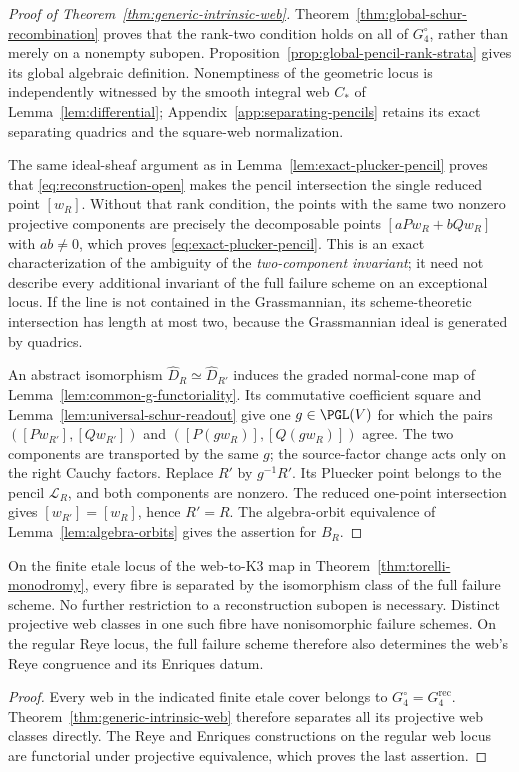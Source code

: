 \begin{proof}[Proof of Theorem~\ref{thm:generic-intrinsic-web}]
Theorem~\ref{thm:global-schur-recombination} proves that the
rank-two condition holds on all of \(G_4^\circ\), rather than
merely on a nonempty subopen.  Proposition~\ref{prop:global-pencil-rank-strata}
gives its global algebraic definition.  Nonemptiness of the geometric
locus is independently witnessed by the smooth integral web
\(C_*\) of Lemma~\ref{lem:differential}; Appendix~\ref{app:separating-pencils}
retains its exact separating quadrics and the square-web normalization.

The same ideal-sheaf argument as in
Lemma~\ref{lem:exact-plucker-pencil} proves that
\eqref{eq:reconstruction-open} makes the pencil intersection the
single reduced point \([w_R]\).  Without that rank condition,
the points with the same two nonzero projective components are
precisely the decomposable points \([aPw_R+bQw_R]\) with
\(ab\ne0\), which proves \eqref{eq:exact-plucker-pencil}.
This is an exact characterization of the ambiguity of the
\emph{two-component invariant}; it need not describe every
additional invariant of the full failure scheme on an exceptional
locus.  If the line is not contained in the Grassmannian, its
scheme-theoretic intersection has length at most two, because the
Grassmannian ideal is generated by quadrics.

An abstract isomorphism \(\widehat D_R\simeq\widehat D_{R'}\)
induces the graded normal-cone map of
Lemma~\ref{lem:common-g-functoriality}.  Its commutative coefficient
square and Lemma~\ref{lem:universal-schur-readout} give one
\(g\in\PGL(V)\) for which the pairs
\(([Pw_{R'}],[Qw_{R'}])\) and
\(([P(gw_R)],[Q(gw_R)])\) agree.  The two components are
transported by the same \(g\); the source-factor change acts only
on the right Cauchy factors.  Replace \(R'\) by
\(g^{-1}R'\).  Its Pluecker point belongs to the pencil
\(\mathscr L_R\), and both components are nonzero.  The reduced
one-point intersection gives \([w_{R'}]=[w_R]\), hence
\(R'=R\).  The algebra-orbit equivalence of
Lemma~\ref{lem:algebra-orbits} gives the assertion for \(B_R\).
\end{proof}

\begin{corollary}
\label{cor:separate-torelli-packet}
On the finite etale locus of the web-to-K3 map in
Theorem~\ref{thm:torelli-monodromy}, every fibre is separated by
the isomorphism class of the full failure scheme.  No further
restriction to a reconstruction subopen is necessary.
Distinct projective web classes in one such fibre have nonisomorphic
failure schemes.  On the regular Reye locus, the full failure scheme
therefore also determines the web's Reye congruence and its Enriques
datum.
\end{corollary}
\begin{proof}
Every web in the indicated finite etale cover belongs to
\(G_4^\circ=G_4^{\mathrm{rec}}\).  Theorem~\ref{thm:generic-intrinsic-web}
therefore separates all its projective web classes directly.
The Reye and Enriques constructions on
the regular web locus are functorial under projective equivalence,
which proves the last assertion.
\end{proof}

